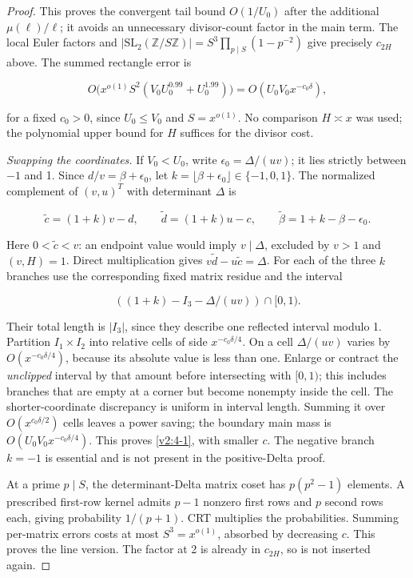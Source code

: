 \documentclass[11pt]{article}
\theoremstyle{definition}
\theoremstyle{remark}
\numberwithin{equation}{section}
\begin{document}
\begin{proof}
This proves the convergent tail bound $O(1/U_0)$ after the additional $\mu(\ell)/\ell$; it avoids an unnecessary divisor-count factor in the main term. The local Euler factors and $|\mathrm{SL}_2(\mathbb Z/S\mathbb Z)|=S^3\prod_{p\mid S}(1-p^{-2})$ give precisely $c_{2H}$ above. The summed rectangle error is


\begin{equation}
O\big(x^{o(1)}S^2(V_0U_0^{0.99}+U_0^{1.99})\big)
=O(U_0V_0x^{-c_0\delta}),
\end{equation}


for a fixed $c_0>0$, since $U_0\le V_0$ and $S=x^{o(1)}$. No comparison $H\asymp x$ was used; the polynomial upper bound for $H$ suffices for the divisor cost.

\emph{Swapping the coordinates.} If $V_0<U_0$, write $\epsilon_0=\Delta/(uv)$; it lies strictly between $-1$ and 1. Since $d/v=\beta+\epsilon_0$, let $k=\lfloor\beta+\epsilon_0\rfloor\in\{-1,0,1\}$. The normalized complement of $(v,u)^T$ with determinant $\Delta$ is


\begin{equation}\label{v2:4-3}
\widetilde c=(1+k)v-d,\qquad \widetilde d=(1+k)u-c,\qquad
\widetilde\beta=1+k-\beta-\epsilon_0.
\end{equation}


Here $0<\widetilde c<v$: an endpoint value would imply $v\mid\Delta$, excluded by $v>1$ and $(v,H)=1$. Direct multiplication gives $v\widetilde d-u\widetilde c=\Delta$. For each of the three $k$ branches use the corresponding fixed matrix residue and the interval


\begin{equation}
((1+k)-I_3-\Delta/(uv))\cap[0,1).
\end{equation}


Their total length is $|I_3|$, since they describe one reflected interval modulo 1. Partition $I_1\times I_2$ into relative cells of side $x^{-c_0\delta/4}$. On a cell $\Delta/(uv)$ varies by $O(x^{-c_0\delta/4})$, because its absolute value is less than one. Enlarge or contract the \emph{unclipped} interval by that amount before intersecting with $[0,1)$; this includes branches that are empty at a corner but become nonempty inside the cell. The shorter-coordinate discrepancy is uniform in interval length. Summing it over $O(x^{c_0\delta/2})$ cells leaves a power saving; the boundary main mass is $O(U_0V_0x^{-c_0\delta/4})$. This proves \eqref{v2:4-1}, with smaller $c$. The negative branch $k=-1$ is essential and is not present in the positive-Delta proof.

At a prime $p\mid S$, the determinant-Delta matrix coset has $p(p^2-1)$ elements. A prescribed first-row kernel admits $p-1$ nonzero first rows and $p$ second rows each, giving probability $1/(p+1)$. CRT multiplies the probabilities. Summing per-matrix errors costs at most $S^3=x^{o(1)}$, absorbed by decreasing $c$. This proves the line version. The factor at 2 is already in $c_{2H}$, so is not inserted again.

\end{proof}
\end{document}
